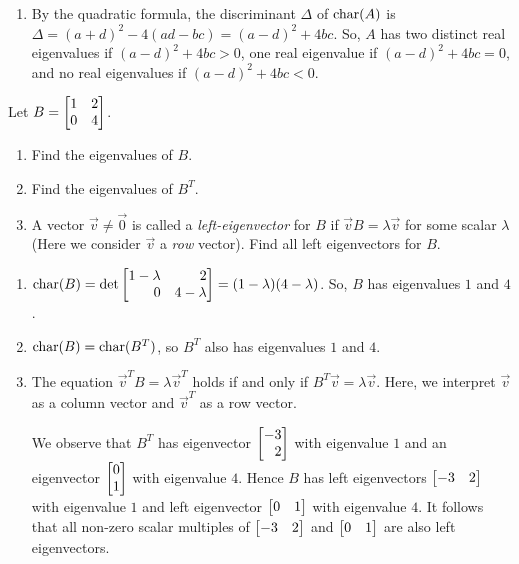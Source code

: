 \begin{exercises}
\begin{problist}
\begin{solution}
\begin{enumerate}
				\item By the quadratic formula, the discriminant $\Delta$ of
					$\operatorname{char}(A)$ is $\Delta = (a + d)^{2} - 4(ad - bc) =
					(a - d)^{2} + 4 bc$. So, $A$ has two distinct real
					eigenvalues if $(a - d)^{2} + 4bc > 0$, one real eigenvalue
					if $(a - d)^{2} + 4bc = 0$, and no real
					eigenvalues if $(a - d)^{2} + 4bc < 0.$
			\end{enumerate}
		\end{solution}

		\prob Let $B=\mat{1&2\\0&4}$.
		\begin{enumerate}
			\item Find the eigenvalues of $B$.

			\item Find the eigenvalues of $B^{T}$.

			\item A vector $\vec v\neq\vec 0$ is called a \emph{left-eigenvector}
				for $B$ if $\vec vB=\lambda \vec v$ for some scalar
				$\lambda$ (Here we consider $\vec v$ a \emph{row} vector).
				Find all left eigenvectors for $B$.
		\end{enumerate}


		\begin{solution}

			\begin{enumerate}
				\item $\Char(B) = \det\mat{1 -\lambda & 2 \\ 0 & 4 - \lambda}=
					(1 - \lambda)(4 - \lambda)$. So, $B$ has
					eigenvalues $1$ and $4$.

				\item $\operatorname{char}(B) = \operatorname{char}(B^{T})$, so $B^{T}$ also has
					eigenvalues $1$ and $4$.

				\item The equation $\vec{v}^{T}B = \lambda \vec{v}^{T}$ holds if and only if $B^{T}
					\vec{v}= \lambda \vec{v}$. Here, we interpret $\vec{v}$ as
					a column vector and $\vec{v}^{T}$ as a 
					row vector.

					We observe that $B^{T}$ has eigenvector
					$\mat{-3 \\ 2}$ with eigenvalue $1$ and an eigenvector
					$\mat{0\\1}$ with eigenvalue $4$. Hence $B$ has
					left eigenvectors $\mat{-3 & 2}$ with eigenvalue $1$
					and left eigenvector $\mat{0 & 1}$ with eigenvalue
					$4$. It follows that all non-zero scalar multiples of 
					$\mat{ -3 & 2 }$ and $\mat{ 0 & 1 }$
					are also left eigenvectors.
			\end{enumerate}
		\end{solution}


\end{problist}
\end{exercises}
